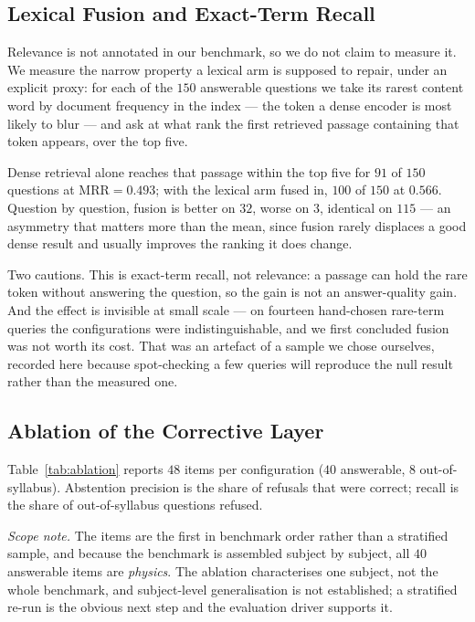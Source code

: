 \documentclass[conference]{IEEEtran}
\begin{document}
\subsection{Lexical Fusion and Exact-Term Recall}
\label{sec:hybrideval}
Relevance is not annotated in our benchmark, so we do not claim to measure it.
We measure the narrow property a lexical arm is supposed to repair, under an
explicit proxy: for each of the $150$ answerable questions we take its rarest
content word by document frequency in the index --- the token a dense encoder is
most likely to blur --- and ask at what rank the first retrieved passage
containing that token appears, over the top five.

Dense retrieval alone reaches that passage within the top five for $91$ of
$150$ questions at $\mathrm{MRR} = 0.493$; with the lexical arm fused in, $100$
of $150$ at $0.566$. Question by question, fusion is better on $32$, worse on
$3$, identical on $115$ --- an asymmetry that matters more than the mean, since
fusion rarely displaces a good dense result and usually improves the ranking it
does change.

Two cautions. This is exact-term recall, not relevance: a passage can hold the
rare token without answering the question, so the gain is not an answer-quality
gain. And the effect is invisible at small scale --- on fourteen hand-chosen
rare-term queries the configurations were indistinguishable, and we first
concluded fusion was not worth its cost. That was an artefact of a sample we
chose ourselves, recorded here because spot-checking a few queries
will reproduce the null result rather than the measured one.

\subsection{Ablation of the Corrective Layer}
\label{sec:ablation}
Table~\ref{tab:ablation} reports $48$ items per configuration ($40$ answerable,
$8$ out-of-syllabus). Abstention precision is the share of refusals that were
correct; recall is the share of out-of-syllabus questions refused.

\textit{Scope note.} The items are the first in benchmark order rather than a
stratified sample, and because the benchmark is assembled subject by subject,
all $40$ answerable items are \emph{physics}. The ablation characterises one
subject, not the whole benchmark, and subject-level generalisation is not
established; a stratified re-run is the obvious next step and the evaluation driver supports it.
\end{document}
